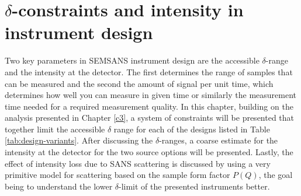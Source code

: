 \documentclass{article}
\begin{document}

\newpage
\section{$\delta$-constraints and intensity in instrument design}
\label{c4:constraints}
Two key parameters in SEMSANS instrument design are the accessible $\delta$-range and the intensity at the detector. The first determines the range of samples that can be measured and the second the amount of signal per unit time, which determines how well you can measure in given time or similarly the measurement time needed for a required measurement quality. In this chapter, building on the analysis presented in Chapter \ref{c3}, a system of constraints will be presented that together limit the accessible $\delta$ range for each of the designs listed in Table \ref{tab:design-variants}. After discussing the $\delta$-ranges, a coarse estimate for the intensity at the detector for the two source options will be presented. Lastly, the effect of intensity loss due to SANS scattering is discussed by using a very primitive model for scattering based on the sample form factor $P(Q)$, the goal being to understand the lower $\delta$-limit of the presented instruments better.
\end{document}
